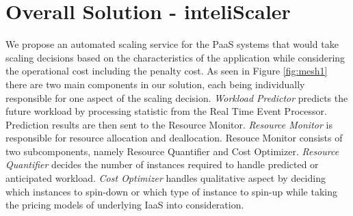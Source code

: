 \section{Overall Solution - inteliScaler}
We propose an automated scaling service for the PaaS systems that would take scaling decisions based on the characteristics of the application while considering the operational cost including the penalty cost. As seen in Figure \ref{fig:mesh1} there are two main components in our solution, each being individually responsible for one aspect of the scaling decision. \textit{Workload Predictor} predicts the future workload by processing statistic from the Real Time Event Processor. Prediction results are then sent to the Resource Monitor. \textit{Resource Monitor} is responsible for resource allocation and deallocation. Resouce Monitor consists of two subcomponents, namely Resource Quantifier and Cost Optimizer. \textit{Resource Quantifier} decides the number of instances required to handle predicted or anticipated workload. \textit{Cost Optimizer} handles qualitative aspect by deciding which instances to spin-down or which type of instance to spin-up while taking the pricing models of underlying IaaS into consideration.